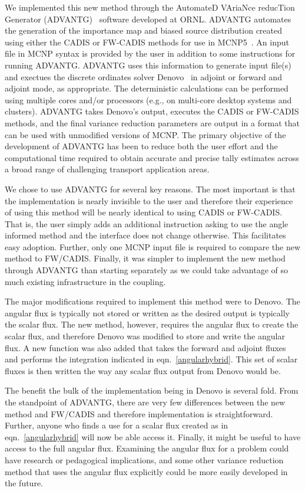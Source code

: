 \documentclass[12pt]{article}
\begin{document}
We implemented this new method through the AutomateD VAriaNce reducTion Generator (ADVANTG)~\cite{wagner_automated_2002, mosher_new_2010} software developed at ORNL. 
ADVANTG automates the generation of the importance map and biased source distribution created using either the CADIS or FW-CADIS methods for use in MCNP5~\cite{brown_mcnp_2002}. 
An input file in MCNP syntax is provided by the user in addition to some instructions for running ADVANTG. 
ADVANTG uses this information to generate input file(s) and exectues the discrete ordinates solver Denovo~\cite{evans_denovo:_2010} in adjoint or forward and adjoint mode, as appropriate.
The deterministic calculations can be performed using multiple cores and/or processors (e.g., on multi-core desktop systems and clusters). 
ADVANTG takes Denovo's output, executes the CADIS or FW-CADIS methods, and the final variance reduction parameters are output in a format that can be used with unmodified versions of MCNP. 
The primary objective of the development of ADVANTG has been to reduce both the user effort and the computational time required to obtain accurate and precise tally estimates
across a broad range of challenging transport application areas.

We chose to use ADVANTG for several key reasons. 
The most important is that the implementation is nearly invisible to the user and therefore their experience of using this method will be nearly identical to using CADIS or FW-CADIS.
That is, the user simply adds an additional instruction asking to use the angle informed method and the interface does not change otherwise.
This facilitates easy adoption.
Further, only one MCNP input file is required to compare the new method to FW/CADIS.
Finally, it was simpler to implement the new method through ADVANTG than starting separately as we could take advantage of so much existing infrastructure in the coupling.

The major modifications required to implement this method were to Denovo. 
The angular flux is typically not stored or written as the desired output is typically the scalar flux.
The new method, however, requires the angular flux to create the scalar flux, and therefore Denovo was modified to store and write the angular flux.
A new function was also added that takes the forward and adjoint fluxes and performs the integration indicated in eqn.~\eqref{angularhybrid}. 
This set of scalar fluxes is then written the way any scalar flux output from Denovo would be.

The benefit the bulk of the implementation being in Denovo is several fold. 
From the standpoint of ADVANTG, there are very few differences between the new method and FW/CADIS and therefore implementation is straightforward.
Further, anyone who finds a use for a scalar flux created as in eqn.~\eqref{angularhybrid} will now be able  access it.
Finally, it might be useful to have access to the full angular flux. 
Examining the angular flux for a problem could have research or pedagogical implications, and some other variance reduction method that uses the angular flux explicitly could be more easily developed in the future.
\end{document}
